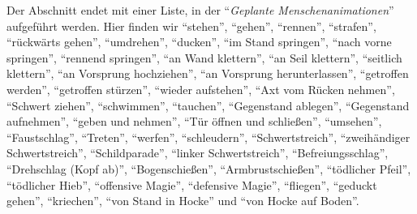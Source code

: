 \documentclass[a5paper,pagesize]{scrbook}
\begin{document}
Der Abschnitt endet mit einer Liste, in der \enquote{\textit{Geplante Menschenanimationen}} aufgeführt werden.
Hier finden wir \enquote{stehen}, \enquote{gehen}, \enquote{rennen}, \enquote{strafen}, \enquote{rückwärts gehen}, \enquote{umdrehen}, \enquote{ducken}, \enquote{im Stand springen}, \enquote{nach vorne springen}, \enquote{rennend springen}, \enquote{an Wand klettern}, \enquote{an Seil klettern}, \enquote{seitlich klettern}, \enquote{an Vorsprung hochziehen}, \enquote{an Vorsprung herunterlassen}, \enquote{getroffen werden}, \enquote{getroffen stürzen}, \enquote{wieder aufstehen}, \enquote{Axt vom Rücken nehmen}, \enquote{Schwert ziehen}, \enquote{schwimmen}, \enquote{tauchen}, \enquote{Gegenstand ablegen}, \enquote{Gegenstand aufnehmen}, \enquote{geben und nehmen}, \enquote{Tür öffnen und schließen}, \enquote{umsehen}, \enquote{Faustschlag}, \enquote{Treten}, \enquote{werfen}, \enquote{schleudern}, \enquote{Schwertstreich}, \enquote{zweihändiger Schwertstreich}, \enquote{Schildparade}, \enquote{linker Schwertstreich}, \enquote{Befreiungsschlag}, \enquote{Drehschlag (Kopf ab)}, \enquote{Bogenschießen}, \enquote{Armbrustschießen}, \enquote{tödlicher Pfeil}, \enquote{tödlicher Hieb}, \enquote{offensive Magie}, \enquote{defensive Magie}, \enquote{fliegen}, \enquote{geduckt gehen}, \enquote{kriechen}, \enquote{von Stand in Hocke} und \enquote{von Hocke auf Boden}.\autocite[S.~1\,f.]{orpheus_zusammenfassung}
\end{document}
